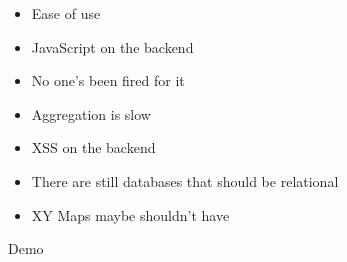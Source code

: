 \documentclass{beamer}
\begin{document}
\begin{frame}%

\begin{itemize}
\item Ease of use
\item JavaScript on the backend
\end{itemize}

\end{frame}


\begin{frame}%

\begin{itemize}
\item No one's been fired for it
\item Aggregation is slow
\item XSS on the backend
\item There are still databases that should be relational
\item XY Maps maybe shouldn't have
\end{itemize}

\end{frame}


\begin{frame}%

\begin{center}
   Demo
\end{center}

\end{frame}


\begin{frame}%


\end{frame}


\begin{frame}%


\end{frame}


\begin{frame}%


\end{frame}
\end{document}
